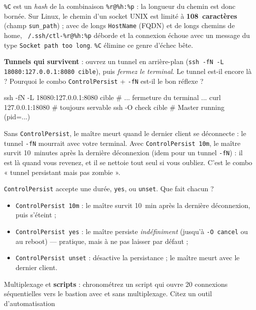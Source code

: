 \documentclass[a4paper,10pt]{exam}
\begin{document}
\begin{questions}
\begin{solution}
\texttt{\%C} est un \emph{hash} de la combinaison \texttt{\%r@\%h:\%p} : la longueur du
chemin est donc bornée. Sur Linux, le chemin d'un socket UNIX est limité à
\textbf{108~caractères} (champ \texttt{sun\_path}) ; avec de longs
\texttt{HostName} (FQDN) et de longs chemins de home,
\texttt{~/.ssh/ctl-\%r@\%h:\%p} déborde et la connexion échoue avec un message du type
\texttt{Socket path too long}. \texttt{\%C} élimine ce genre d'échec bête.
\end{solution}
\question \textbf{Tunnels qui survivent} : ouvrez un tunnel en arrière-plan
(\texttt{ssh -fN -L 18080:127.0.0.1:8080 cible}), puis \emph{fermez le terminal}.
Le tunnel est-il encore là ? Pourquoi le combo \texttt{ControlPersist} + \texttt{-fN} est-il
le bon réflexe ?
\begin{solution}
\begin{bashcode}
ssh -fN -L 18080:127.0.0.1:8080 cible
# ... fermeture du terminal ...
curl 127.0.0.1:18080     # toujours servable
ssh -O check cible       # Master running (pid=...)
\end{bashcode}
Sans \texttt{ControlPersist}, le maître meurt quand le dernier client se déconnecte : le
tunnel \texttt{-fN} mourrait avec votre terminal. Avec
\texttt{ControlPersist 10m}, le maître survit 10~minutes après la dernière déconnexion
(idem pour un tunnel \texttt{-fN}) : il est là quand vous revenez, et il se nettoie tout
seul si vous oubliez. C'est le combo « tunnel persistant mais pas zombie ».
\end{solution}
\question \texttt{ControlPersist} accepte une durée, \texttt{yes}, ou \texttt{unset}.
Que fait chacun ?
\begin{solution}
\begin{itemize}
  \item \texttt{ControlPersist 10m} : le maître survit 10~min après la dernière
        déconnexion, puis s'éteint ;
  \item \texttt{ControlPersist yes} : le maître persiste \emph{indéfiniment} (jusqu'à
        \texttt{-O cancel} ou au reboot) — pratique, mais à ne pas laisser par défaut ;
  \item \texttt{ControlPersist unset} : désactive la persistance ; le maître meurt avec
        le dernier client.
\end{itemize}
\end{solution}
\question Multiplexage et \textbf{scripts} : chronométrez un script qui ouvre 20 connexions
séquentielles vers le bastion avec et sans multiplexage. Citez un outil d'automatisation

\end{questions}
\end{document}
